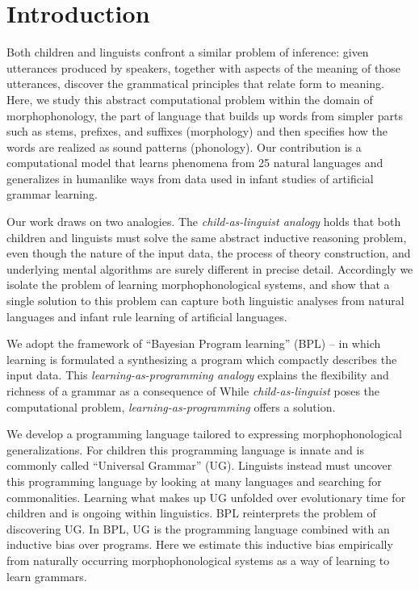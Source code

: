 \documentclass{article}
\begin{document}
\section{Introduction}

Both children and linguists confront a similar problem of inference:
given utterances produced by speakers, together with aspects of the
meaning of those utterances, discover the grammatical principles that
relate form to meaning. Here, we study this abstract computational
problem within the domain of morphophonology, the part of language
that builds up words from simpler parts such as stems, prefixes, and
suffixes (morphology) and then specifies how the words are realized as
sound patterns (phonology).  Our contribution is a computational model
that learns phenomena from 25 natural languages and generalizes in
humanlike ways from data used in infant studies of artificial grammar
learning.

Our work draws on two analogies. The \emph{child-as-linguist analogy}
holds that both children and linguists must solve the same abstract
inductive reasoning problem, even though the nature of the input data,
the process of theory construction, and underlying mental algorithms
are surely different in precise detail. Accordingly we isolate the
problem of learning morphophonological systems, and show that a single
solution to this problem can capture both linguistic analyses from
natural languages and infant rule learning of artificial languages.

We adopt the framework of ``Bayesian Program learning'' (BPL) -- in
which learning is formulated a synthesizing a program which compactly
describes the input data. This \emph{learning-as-programming analogy}
explains the flexibility and richness of a grammar
as a consequence of 
While \emph{child-as-linguist} poses the
computational problem, \emph{learning-as-programming} offers a
solution.

We develop a programming language tailored to expressing
morphophonological generalizations.
For children this programming language is innate and is
commonly called ``Universal Grammar'' (UG). Linguists instead must
uncover this programming language by looking at many languages and
searching for commonalities. Learning what makes up UG unfolded over
evolutionary time for children and is ongoing within linguistics.  BPL
reinterprets the problem of discovering UG.  In BPL, UG is the
programming language combined with an inductive bias over programs.
Here we estimate this inductive bias empirically from naturally
occurring morphophonological systems as a way of learning to learn
grammars.
\end{document}
